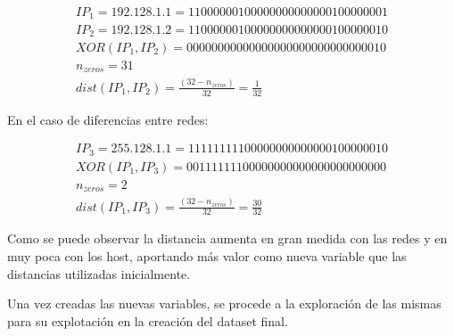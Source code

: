 \begin{gather*}
IP_1 = 192.128.1.1 = 11000000100000000000000100000001 \\
IP_2 = 192.128.1.2 = 11000000100000000000000100000010 \\
XOR(IP_1, IP_2) = 00000000000000000000000000000010 \\
n_{zeros} = 31 \\
dist(IP_1, IP_2) = \frac{(32 - n_{zeros})}{32} = \frac{1}{32}
\end{gather*}

En el caso de diferencias entre redes:

\begin{gather*}
    IP_3 = 255.128.1.1 = 11111111100000000000000100000010 \\
    XOR(IP_1, IP_3) = 00111111100000000000000000000000 \\
    n_{zeros} = 2 \\
    dist(IP_1, IP_3) = \frac{(32 - n_{zeros})}{32} = \frac{30}{32}
\end{gather*}

Como se puede observar la distancia aumenta en gran medida con las redes y en muy poca con los host, aportando más valor como nueva variable que las distancias utilizadas inicialmente.

Una vez creadas las nuevas variables, se procede a la exploración de las mismas para su explotación en la creación del dataset final.